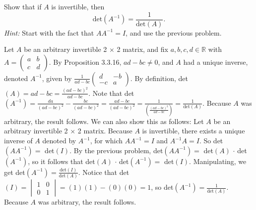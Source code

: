 \documentclass[12pt]{article}
\newenvironment{problem}[2][Problem]
{
	\begin{trivlist} 
		\item[\hskip \labelsep {\bfseries #1 #2:}]
	}
{
	\end{trivlist}
	}
\newenvironment{solution}[1][Solution]
{
	\begin{trivlist} 
		\item[\hskip \labelsep {\itshape #1:}]
	}
	{
	\end{trivlist}
}
\begin{document}
\newpage
\begin{problem}{4}
Show that if $A$ is invertible, then
\[
\text{det}(A^{-1}) = \frac{1}{\text{det}(A)}\text{.}
\]
{\it Hint:} Start with the fact that $AA^{-1}=I$, and use the previous problem.
\noindent
\newline
\newline
\begin{solution}
Let $A$ be an arbitrary invertible 2 $\times$ 2 matrix, and fix $a,b,c,d \in \mathbb{R}$ with $A=\begin{pmatrix}a&b\\c&d\end{pmatrix}$. By Proposition 3.3.16, $ad-bc\neq 0$, and $A$ had a unique inverse, denoted $A^{-1}$, given by $\frac{1}{ad-bc} \begin{pmatrix}d&-b\\-c&a\end{pmatrix}$. By definition, det$(A) = ad-bc = \frac{(ad-bc)^2}{ad-bc}$.  Note that det$(A^{-1}) = \frac{da}{(ad-bc)^2} - \frac{bc}{(ad-bc)^2} = \frac{ad-bc}{(ad-bc)^2} = \frac{1}{\left(\frac{(ad-bc)^2}{ad-bc}\right)}=\frac{1}{\text{det}(A)}$. Because $A$ was arbitrary, the result follows.
\newline
\newline
\newline
We can also show this as follows: Let $A$ be an arbitrary invertible 2 $\times$ 2 matrix. Because $A$ is invertible, there exists a unique inverse of $A$ denoted by $A^{-1}$, for which $AA^{-1} = I$ and $A^{-1} A = I$. So det$(AA^{-1})=$ det$(I)$. By the previous problem, det$(AA^{-1}) =$ det$(A)$ $\cdot$ det$(A^{-1})$, so it follows that det$(A)$ $\cdot$ det$(A^{-1}) = $ det$(I)$. Manipulating, we get det$(A^{-1}) = \frac{\text{det}(I)}{\text{det}(A)}$. Notice that det$(I) = \begin{vmatrix}1&0\\0&1\end{vmatrix} = (1)(1)-(0)(0)=1$, so det$(A^{-1}) = \frac{1}{\text{det}(A)}$. Because $A$ was arbitrary, the result follows.
\end{solution}
\end{problem}
\end{document}
